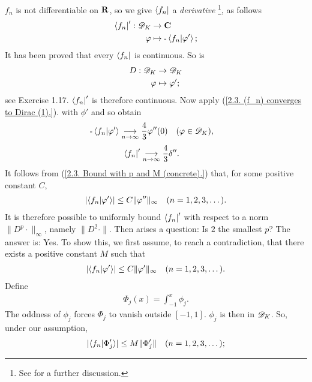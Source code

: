 $f_n$ is not differentiable on ${\mathbf R}$, so we give %
%
  $\bra{f_n}$ %
%
a \textit{derivative}
%
  \footnote{
    See  
    for a further discussion.
  }, %
as follows %
%
  \begin{align}
    \bra{f_n}': {\mathscr D}_K &\to {\mathbf C}\\
                    \varphi &\mapsto \text{\small{-}} \bra{f_n}\ket{\varphi'}; \nonumber
  \end{align}
%
It has been proved that every $\bra{f_n}$ is continuous. %
So is %
%
  \begin{align}
    D : {\mathscr D}_K & \to {\mathscr D}_K \\
        \varphi & \mapsto \varphi'; \nonumber
  \end{align}
see  Exercise 1.17. %
$\bra{f_n}'$ is therefore continuous. Now apply %
%
  (\ref{2.3. (f_n) converges to Dirac (1).}). %
%
with $\phi'$ and so obtain %
%
  \begin{align}
    \text{\small{-}} \bra{f_n}\ket{\varphi'} &\underset{n\to\infty}{\longrightarrow} \frac{4}{3} \varphi''(0)
    \quad(\varphi \in {\mathscr D}_K), \nonumber
  \end{align}
%
\ie %
%
  \begin{align}
    \bra{f_n}' &\underset{n\to\infty}{\longrightarrow} \frac{4}{3} \delta''. 
  \end{align}
%
It follows from %
%
  (\ref{2.3. Bound with p and M (concrete).}) %
%
that, for some positive constant $C$, 
%
  \begin{align}
  \lvert \bra{f_n}\ket{\varphi'} \rvert 
    \leq 
  C \| \varphi''\|_\infty \quad (n=1, 2, 3, \dots).
  \end{align}
%
It is therefore possible to uniformly bound 
%
  $\bra{f_n}'$ %
%
with respect to a norm %
%
  $\|D^p\cdot\|_\infty$, %
%
namely $\|D^2\cdot\|$. 
%
Then arises a question: %
%
  Is $2$ the smallest $p$? 
%
The answer is: Yes. 
%
To show this, we first assume, to reach a contradiction, that %
%
  there exists a positive constant $M$ such that
%
  \begin{align}
    \lvert \langle f_n \lvert \varphi' \rangle \rvert 
      \leq 
    C \| \varphi' \|_\infty 
    \quad (n=1, 2, 3, \dots).
  \end{align}
%
Define %
%
  \begin{align}
    \Phi_{j}(x) = \int_{\minus 1}^x \phi_j.
  \end{align}
%
The oddness of $\phi_j$ forces %
% 
  $\Phi_{j}$ to vanish outside $[\minus 1, 1]$. 
%
$\phi_{j}$ is then in ${\mathscr D}_K$. So, under our assumption, 
%
  \begin{align}
    \lvert 
      \langle{f_n}\lvert \Phi_j' \rangle
    \rvert 
      \leq 
    M \| \Phi_{j}' \|
    \quad (n=1, 2, 3, \dots); 
  \end{align}
